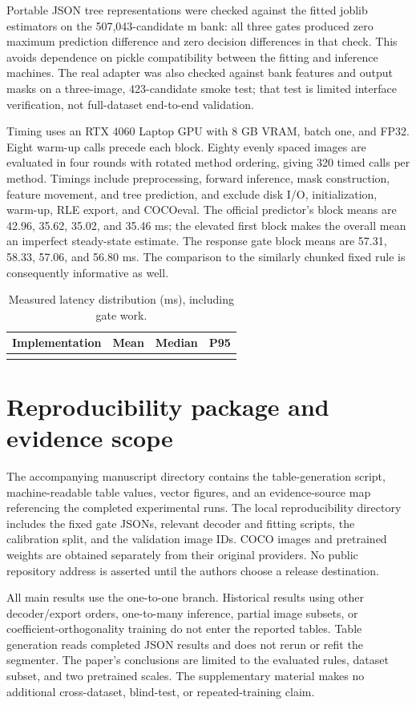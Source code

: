 \documentclass[11pt,a4paper]{article}
\makeatletter
\let\tableinput\@@input
\makeatother
\begin{document}
Portable JSON tree representations were checked against the fitted joblib estimators on the 507,043-candidate m bank: all three gates produced zero maximum prediction difference and zero decision differences in that check. This avoids dependence on pickle compatibility between the fitting and inference machines. The real adapter was also checked against bank features and output masks on a three-image, 423-candidate smoke test; that test is limited interface verification, not full-dataset end-to-end validation.

Timing uses an RTX 4060 Laptop GPU with 8 GB VRAM, batch one, and FP32. Eight warm-up calls precede each block. Eighty evenly spaced images are evaluated in four rounds with rotated method ordering, giving 320 timed calls per method. Timings include preprocessing, forward inference, mask construction, feature movement, and tree prediction, and exclude disk I/O, initialization, warm-up, RLE export, and COCOeval. The official predictor's block means are 42.96, 35.62, 35.02, and 35.46 ms; the elevated first block makes the overall mean an imperfect steady-state estimate. The response gate block means are 57.31, 58.33, 57.06, and 56.80 ms. The comparison to the similarly chunked fixed rule is consequently informative as well.

\begin{table}[htbp]\centering
\caption{Measured latency distribution (ms), including gate work.}\label{tab:speed}
\begin{tabular}{lrrr}\toprule Implementation & Mean & Median & P95\\\midrule
\tableinput{tables/latency.tex}
\bottomrule\end{tabular}\end{table}

\section{Reproducibility package and evidence scope}
The accompanying manuscript directory contains the table-generation script, machine-readable table values, vector figures, and an evidence-source map referencing the completed experimental runs. The local reproducibility directory includes the fixed gate JSONs, relevant decoder and fitting scripts, the calibration split, and the validation image IDs. COCO images and pretrained weights are obtained separately from their original providers. No public repository address is asserted until the authors choose a release destination.

All main results use the one-to-one branch. Historical results using other decoder/export orders, one-to-many inference, partial image subsets, or coefficient-orthogonality training do not enter the reported tables. Table generation reads completed JSON results and does not rerun or refit the segmenter. The paper's conclusions are limited to the evaluated rules, dataset subset, and two pretrained scales. The supplementary material makes no additional cross-dataset, blind-test, or repeated-training claim.
\end{document}
